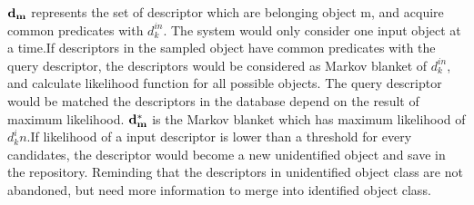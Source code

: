 \documentclass[journal]{IEEEtran}
\begin{document}
$\bf{d_m}$ represents the set of descriptor which are belonging object m, and acquire common predicates with $d^{in}_k$. The system would only consider one input object at a time.If descriptors in the sampled object have common predicates with the query descriptor, the descriptors would be considered as Markov blanket of $d^{in}_k$, and calculate likelihood function for all possible objects. The query descriptor would be matched the descriptors in the database depend on the result of maximum likelihood. $\bf{d_m^*}$ is the Markov blanket which has maximum likelihood of $d_k^in$.If likelihood of a input descriptor is lower than a threshold for every candidates, the descriptor would become a new unidentified object and save in the repository. Reminding that the descriptors in unidentified object class are not abandoned, but need more information to merge into identified object class. 
\end{document}
